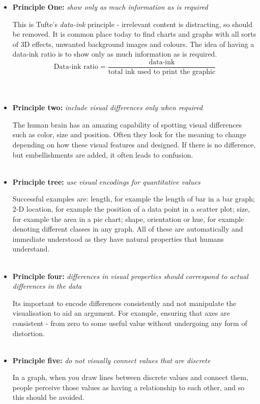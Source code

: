 \documentclass[a4paper,11pt,titlepage]{article}
\begin{document}
		\par
	\begin{itemize}
		\item \textbf{Principle One:}
		\textit{show only as much information as is required}
		\par 
		This is Tufte's \textit{data-ink} principle - irrelevant content is distracting, so should be removed. It is common place today to find charts and graphs with all sorts of 3D effects, unwanted background images and colours. The idea of having a data-ink ratio is to show only as much information as is required.
		$$
		\text{Data-ink ratio} = 
		\frac{\text{data-ink}}{\text{total ink used to print the graphic}}
		$$
		\\\
		\item \textbf{Principle two:}
		\textit{include visual differences only when required} 
		\par
		The human brain has an amazing capability of spotting visual differences such as color, size and position. Often they look for the meaning to change depending on how these visual features and designed. If there is no difference, but embellishments are added, it often leads to confusion.
		\\\ 
		\item \textbf{Principle tree:}
		\textit{use visual encodings for quantitative values}
		\par 
		Successful examples are: length, for example the length of bar in a bar graph; 2-D location, for example the position of a data point in a scatter plot; size, for example the area in a pie chart; shape, orientation or hue, for example denoting different classes in any graph. All of these are automatically and immediate understood as they have natural properties that humans understand. 
		\\\
		\item \textbf{Principle four:}
		\textit{differences in visual properties should correspond to actual differences in the data}
		\par 
		Its important to encode differences consistently and not manipulate the visualisation to aid an argument. For example, ensuring that axes are consistent - from zero to some useful value without undergoing any form of distortion.
		\\\
		\item \textbf{Principle five:}
		\textit{do not visually connect values that are discrete}
		\par 
		In a graph, when you draw lines between discrete values and connect them, people perceive those values as having a relationship to each other, and so this should be avoided.

\end{itemize}
\end{document}

